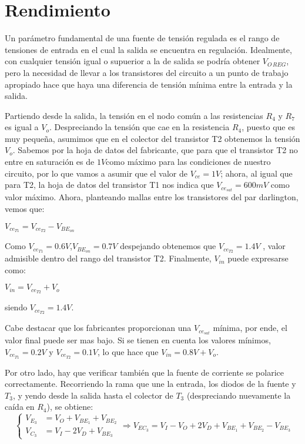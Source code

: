 \documentclass[e2_tp1_main.tex]{subfiles}
\begin{document}
\section{Rendimiento}

Un par\'ametro fundamental de una fuente de tensi\'on regulada es el rango de tensiones de entrada en el cual la salida se encuentra en regulaci\'on. Idealmente, con cualquier tensi\'on igual o supuerior a la de salida se podr\'ia obtener $V_{O\, REG}$, pero la necesidad de llevar a los transistores del circuito a un punto de trabajo apropiado hace que haya una diferencia de tensi\'on m\'inima entre la entrada y la salida. 

Partiendo desde la salida, la tensión en el nodo común a las resistencias $R_4$ y $R_7$ es igual a $V_o$. Despreciando la tensión que cae en la resistencia $R_4$, puesto que es muy pequeña, asumimos que en el colector del transistor T2 obtenemos la tensión $V_o$.
Sabemos por la hoja de datos del fabricante, que para que el transistor T2 no entre en saturación es de $1 V$como máximo para las condiciones de nuestro circuito, por lo que vamos a asumir que el valor de $V_{ce}=1 V$; ahora, al igual que para T2, la hoja de datos del transistor T1 nos indica que  $V_{ce_{sat}}=600mV$ como valor máximo. 
Ahora, planteando mallas entre los transistores del par darlington, vemos que:
\begin{center}
{\large{}$ V_{ce_{T1}}=V_{ce_{T2}}-V_{BE_{on}}$}{\large\par}
\par\end{center}
Como $V_{ce_{T1}}=0.6V$,$V_{BE_{on}}=0.7V$ despejando obtenemos que $V_{ce_{T2}}=1.4V$ , valor admisible dentro del rango del transistor T2.
Finalmente, $V_{in}$ puede expresarse como:
\begin{center}
{\large{}$ V_{in}=V_{ce_{T2}}+V_{o}$}{\large\par}
\par\end{center}

siendo $V_{ce_{T2}}=1.4 V$.

Cabe destacar que los fabricantes proporcionan una $V_{ce_{sat}}$ mínima, por ende, el valor final puede ser mas bajo. Si se tienen en cuenta los valores mínimos, $V_{ce_{T1}}=0.2V$ y $V_{ce_{T2}}=0.1V$, lo que hace que $ V_{in}=0.8V+V_{o}$.

Por otro lado, hay que verificar tambi\'en que la fuente de corriente se polarice correctamente. Recorriendo la rama que une la entrada, los diodos de la fuente y $T_3$, y yendo desde la salida hasta el colector de $T_3$ (despreciando nuevamente la ca\'ida en $R_4$), se obtiene:
\begin{equation}
	\left\{
	\begin{aligned}
	V_{E_3} &= V_O + V_{BE_1} +  V_{BE_2}\\
	V_{C_3} &= 	V_I - 2V_D +  V_{BE_3}
	\end{aligned}
	\right.
	\Rightarrow V_{EC_3} = V_I - V_O + 2V_D+  V_{BE_1} +  V_{BE_2} -  V_{BE_3}
\end{equation}
\end{document}
